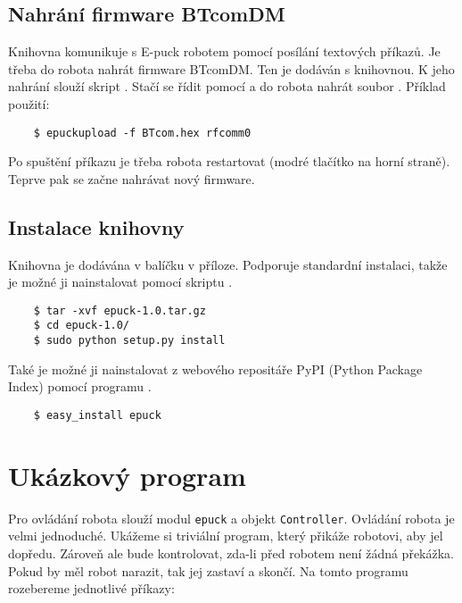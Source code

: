     \subsection{Nahrání firmware BTcomDM}

    Knihovna komunikuje s E-puck robotem pomocí posílání textových příkazů. Je
    třeba do robota nahrát firmware BTcomDM. Ten je dodáván s knihovnou.
    K jeho nahrání slouží skript  \cite{epuckupload}. Stačí
    se řídit pomocí  a do robota nahrát soubor .
    Příklad použití:

    \begin{verbatim}
    $ epuckupload -f BTcom.hex rfcomm0
    \end{verbatim}

    Po spuštění příkazu je třeba robota restartovat (modré tlačítko na horní
    straně). Teprve pak se začne nahrávat nový firmware.

    \subsection{Instalace knihovny}

    Knihovna je dodávána v balíčku v příloze. Podporuje standardní instalaci,
    takže je možné ji nainstalovat pomocí skriptu .

    \begin{verbatim}
    $ tar -xvf epuck-1.0.tar.gz
    $ cd epuck-1.0/
    $ sudo python setup.py install
    \end{verbatim}

    Také je možné ji nainstalovat z webového repositáře PyPI (Python Package
    Index) \cite{pypi} pomocí programu .

    \begin{verbatim}
    $ easy_install epuck
    \end{verbatim}

\section{Ukázkový program}
\label{ukazkovy_program}

    Pro ovládání robota slouží modul {\tt epuck} a objekt {\tt Controller}.
    Ovládání robota je velmi jednoduché. Ukážeme si triviální program, který
    přikáže robotovi, aby jel dopředu. Zároveň ale bude kontrolovat, zda-li
    před robotem není žádná překážka. Pokud by měl robot narazit, tak jej
    zastaví a skončí. Na tomto programu rozebereme jednotlivé příkazy:

